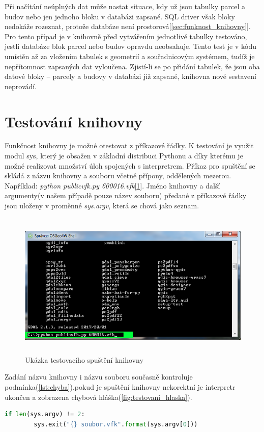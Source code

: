 Při načítání neúplných dat  může nastat situace, kdy už jsou
tabulky parcel a budov nebo jen jednoho bloku v databázi zapsané. SQL
driver však bloky nedokáže rozeznat, protože databáze není
prostorová[\ref{sec:funknost_knihovny}]. Pro tento případ je v
knihovně před vytvářením jednotlivé tabulky testováno, jestli databáze
blok parcel nebo budov opravdu neobsahuje. Tento test je v kódu
umístěn až za vložením tabulek s geometrií a souřadnicovým systémem,
tudíž je nepřítomnost zapsaných dat vyloučena. Zjistí-li se po přidání
tabulek, že jsou oba datové bloky -- parcely a budovy v databázi již
zapsané, knihovna nové sestavení neprovádí.
\section{Testování knihovny}
Funkčnost knihovny je možné otestovat z příkazové řádky. K testování
je využit modul sys, který je obsažen v základní distribuci Pythonu a
díky kterému je možné realizovat množství úloh spojených s
interpretrem. Příkaz pro spuštění se skládá z názvu knihovny a
 souboru včetně přípony, oddělených mezerou. Například:
\textit{python publicvfk.py
  600016.vfk}[\ref{fig:testovani_ukazka}]. Jméno knihovny a další
argumenty(v našem případě pouze název  souboru) předané z
příkazové řádky jsou uloženy v proměnné \textit{sys.argv}, která se
chová jako seznam.

\begin{figure}[H]
	 \centering
      \includegraphics[height=7cm]{./pictures/testovani_ukazka.png}
      \caption{Ukázka testovacího spuštění knihovny}
      \label{fig:testovani_ukazka}
  \end{figure}

Zadání názvu knihovny i názvu  souboru současně kontroluje
podmínka(\ref{lst:chyba}),pokud je spuštění knihovny nekorektní je
interpretr ukončen a zobrazena chybová
hláška(\ref{fig:testovani_hlaska}).
\begin{lstlisting}[caption=Podmínka pro spouštěcí příkaz, language=Python, label=lst:chyba, numbers=none]
    if len(sys.argv) != 2:
        sys.exit("{} soubor.vfk".format(sys.argv[0]))
\end{lstlisting}

